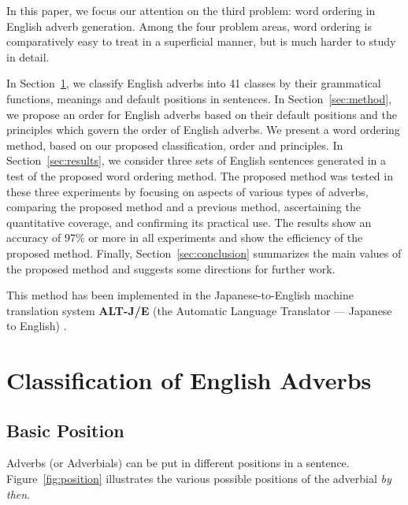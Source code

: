 In this paper, we focus our attention on the third problem: word
ordering in English adverb generation.  Among the four problem areas,
word ordering is comparatively easy to
treat in a superficial manner, but is much harder to study in detail.

In Section~\ref{sec:classification}, we classify English adverbs into
41 classes by their grammatical functions, meanings and default
positions in sentences.  In Section~\ref{sec:method}, we propose an
order for English adverbs based on their default positions and the
principles which govern the order of English adverbs.  
We present a word ordering method, based on our proposed classification, 
order and principles.  
In Section~\ref{sec:results}, we consider three sets of English sentences
generated in a test of the proposed word ordering method.  The
proposed method was tested in these three experiments by focusing on
aspects of various types of adverbs, comparing the proposed method and
a previous method, ascertaining the quantitative coverage, and
confirming its practical use. The results show an accuracy of 97\% or
more in all experiments and show the efficiency of the proposed
method.  Finally, Section~\ref{sec:conclusion} summarizes the main
values of the proposed method and suggests some directions for further
work.

This method has been implemented in the Japanese-to-English machine
translation system {\bf ALT-J/E} (the Automatic Language Translator
--- Japanese to English) \cite{Ikehara:89,Ikehara:91,Ogura:93}.

\section{Classification of English Adverbs}
\label{sec:classification}

\subsection{Basic Position}

  Adverbs (or Adverbials) can be put in different positions in a sentence. 
Figure~\ref{fig:position} illustrates the various possible positions of 
the adverbial {\em by then}.

